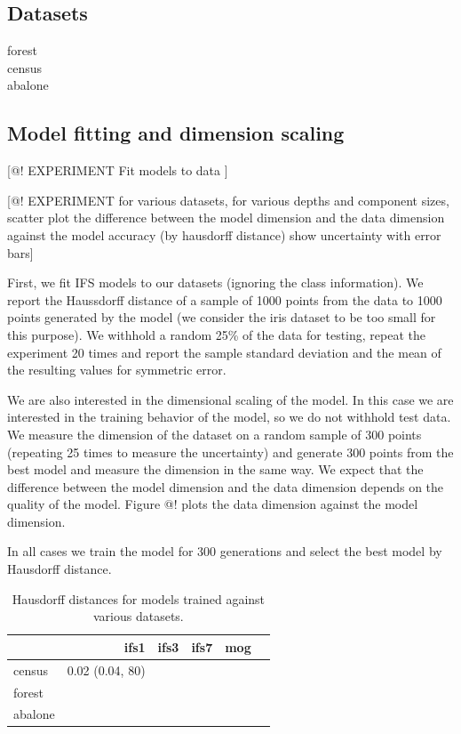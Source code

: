 \documentclass[10pt,a4paper,oneside]{article}
\theoremstyle{definition}
\begin{document}
\subsection*{Datasets}

\begin{description}
  \item[forest]
  \item[census]
  \item[abalone]
\end{description}

\subsection*{Model fitting and dimension scaling}

[@! EXPERIMENT Fit models to data ]

[@! EXPERIMENT for various datasets, for various depths and component sizes, scatter plot the difference between the model dimension and the data dimension against the model accuracy (by hausdorff distance) show uncertainty with error bars]

First, we fit IFS models to our datasets (ignoring the class information). We report the Haussdorff distance of a sample of 1000 points from the data to 1000 points generated by the model (we consider the iris dataset to be too small for this purpose). We withhold a random 25\% of the data for testing, repeat the experiment 20 times and report the sample standard deviation and the mean of the resulting values for symmetric error.

We are also interested in the dimensional scaling of the model. In this case we are interested in the training behavior of the model, so we do not withhold test data. We measure the dimension of the dataset on a random sample of 300 points (repeating 25 times to measure the uncertainty) and generate 300 points from the best model and measure the dimension in the same way. We expect that the difference between the model dimension and the data dimension depends on the quality of the model. Figure @! plots the data dimension against the model dimension. 


In all cases we train the model for 300 generations and select the best model by Hausdorff distance. 

\begin{table}
\begin{tabular}{l | r r r r | r |}
\hline
 & ifs1 & ifs3 & ifs7 & mog \\
\hline
census & 0.02 (0.04, 80) & & & & \\
forest & & & & & \\
abalone & & & & & \\
\hline

\end{tabular}
\caption{Hausdorff distances for models trained against various datasets.}
\label{tablelabel}
\end{table}
\end{document}
